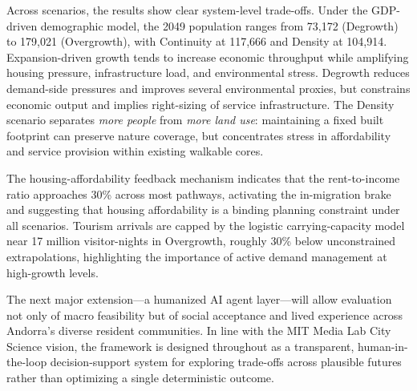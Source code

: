 \documentclass[urbansci,article,submit,pdftex,moreauthors]{Definitions/mdpi}
\begin{document}
Across scenarios, the results show clear system-level trade-offs. Under the
GDP-driven demographic model, the 2049 population ranges from 73{,}172
(Degrowth) to 179{,}021 (Overgrowth), with Continuity at 117{,}666 and Density
at 104{,}914. Expansion-driven growth tends to increase economic throughput
while amplifying housing pressure, infrastructure load, and environmental
stress. Degrowth reduces demand-side pressures and improves several
environmental proxies, but constrains economic output and implies right-sizing
of service infrastructure. The Density scenario separates \emph{more people}
from \emph{more land use}: maintaining a fixed built footprint can preserve
nature coverage, but concentrates stress in affordability and service provision
within existing walkable cores.

The housing-affordability feedback mechanism indicates that the rent-to-income
ratio approaches 30\% across most pathways, activating the in-migration brake
and suggesting that housing affordability is a binding planning constraint under
all scenarios. Tourism arrivals are capped by the logistic carrying-capacity
model near 17 million visitor-nights in Overgrowth, roughly 30\% below
unconstrained extrapolations, highlighting the importance of active demand
management at high-growth levels.

The next major extension---a humanized AI agent layer---will allow evaluation
not only of macro feasibility but of social acceptance and lived experience
across Andorra's diverse resident communities. In line with the MIT Media Lab
City Science vision, the framework is designed throughout as a transparent,
human-in-the-loop decision-support system for exploring trade-offs across
plausible futures rather than optimizing a single deterministic outcome.

\vspace{6pt}


\end{document}
